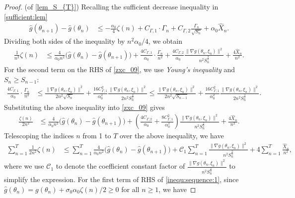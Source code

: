 \documentclass[standalone]{article}
\begin{document}
\begin{proof}(of \cref{lem_S_{T}})
Recalling the sufficient decrease inequality in \cref{sufficient:lem}
\begin{align*}
\hat{g}(\theta_{n+1})-\hat{g}(\theta_{n}) & \le -\frac{\alpha_{0}}{4}\zeta(n)+C_{\Gamma,1}\cdot \Gamma_n  +C_{\Gamma,2}\frac{\Gamma_{n}}{\sqrt{S_{n}}}  + \alpha_0 \hat{X}_{n}.
\end{align*}
Dividing both sides of the inequality by $n^2\alpha_0/4$, we obtain
\begin{align}\label{zxc_09}
\frac{1}{n^{2}} \zeta(n) &\le \frac{4}{\alpha_0n^{2}}\big(\hat{g}(\theta_{n})-\hat{g}(\theta_{n+1})\big)+\frac{4C_{\Gamma,1}}{\alpha_0}\cdot\frac{\Gamma_n}{n^{2}}  +\frac{4C_{\Gamma,2}}{\alpha_0}\frac{\|\nabla g(\theta_{n},\xi_{n})\|^{2}}{n^2 S_{n}^{\frac{3}{2}}}+\frac{4 \hat{X}_{n}}{n^{2}}.
\end{align}
For the second term on the RHS of \cref{zxc_09}, we use \emph{Young's inequality} and $S_n \geq S_{n-1}$:
\begin{equation}\nonumber\begin{aligned}
 \frac{4C_{\Gamma,1}}{\alpha_0}\cdot\frac{\Gamma_n}{n^{2}} &\le \frac{\|\nabla g(\theta_{n},\xi_{n})\|^{2}}{2n^{2}\sqrt{S_{n}}}+\frac{16C_{\Gamma,1}^2}{\alpha_0^2}\frac{\|\nabla g(\theta_{n},\xi_{n})\|^{2}}{2n^2S_{n}^{\frac{3}{2}}}  \le \frac{\|\nabla g(\theta_{n},\xi_{n})\|^{2}}{2n^{2}\sqrt{S_{n-1}}}+\frac{16C_{\Gamma,1}^2}{\alpha_0^2}\frac{\|\nabla g(\theta_{n},\xi_{n})\|^{2}}{2n^2S_{n}^{\frac{3}{2}}}.
\end{aligned}\end{equation}
Substituting the above inequality into \cref{zxc_09} gives
\begin{align*}
\frac{\zeta(n)}{2n^{2}}  &\le \frac{4}{\alpha_0n^{2}}\big(\hat{g}(\theta_{n})-\hat{g}(\theta_{n+1})\big)+\left(\frac{4C_{\Gamma,2}}{\alpha_0} + \frac{8C_{\Gamma,1}^2}{\alpha_0^2}\right)\frac{\|\nabla g(\theta_{n},\xi_{n})\|^{2}}{n^2 S_{n}^{\frac{3}{2}}}    +\frac{4 \hat{X}_{n}}{n^{2}}.
\end{align*}
Telescoping the indices \( n \) from 1 to \( T \) over the above inequality, we have
\begin{align}\label{inequ:sequence:1}
\sum_{n=1}^{T} \frac{1}{2n^2}\zeta(n) &\le \sum_{n=1}^{T} \frac{4}{\alpha_0n^{2}}\big(\hat{g}(\theta_{n})-\hat{g}(\theta_{n+1})\big) +\mathcal{C}_1 \sum_{n=1}^T\frac{\|\nabla g(\theta_{n},\xi_{n})\|^{2}}{n^2 S_{n}^{\frac{3}{2}}}  + 4\sum_{n=1}^{T}\frac{\hat{X}_{n}}{n^{2}},
\end{align}
where we use $\mathcal{C}_1$ to denote the coefficient constant factor of $\frac{\|\nabla g(\theta_{n},\xi_{n})\|^{2}}{n^2 S_{n}^{\frac{3}{2}}}$ to simplify the expression. For the first term of RHS of \cref{inequ:sequence:1}, since $\hat{g}(\theta_n) = g(\theta_n) + \sigma_0\alpha_0\zeta(n)/2 \geq 0$ for all $n \geq 1$, we have 

\end{proof}
\end{document}
